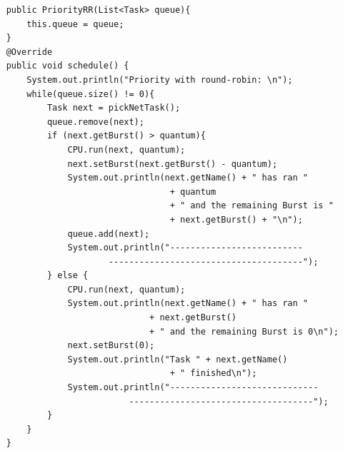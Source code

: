 \documentclass[12pt]{article}
\newenvironment{sol}[1][Solution]{\begin{trivlist}\item[\hskip\labelsep {\bfseries #1:}]}{\end{trivlist}}
\begin{document}
\begin{enumerate}
\begin{sol}
\begin{enumerate}
\begin{verbatim}
    public PriorityRR(List<Task> queue){
        this.queue = queue;
    }
    @Override
    public void schedule() {
        System.out.println("Priority with round-robin: \n");
        while(queue.size() != 0){
            Task next = pickNetTask();
            queue.remove(next);
            if (next.getBurst() > quantum){
                CPU.run(next, quantum);
                next.setBurst(next.getBurst() - quantum);
                System.out.println(next.getName() + " has ran " 
                                    + quantum 
                                    + " and the remaining Burst is " 
                                    + next.getBurst() + "\n");
                queue.add(next);
                System.out.println("--------------------------
                        --------------------------------------");
            } else {
                CPU.run(next, quantum);
                System.out.println(next.getName() + " has ran " 
                                + next.getBurst() 
                                + " and the remaining Burst is 0\n");
                next.setBurst(0);
                System.out.println("Task " + next.getName() 
                                    + " finished\n");
                System.out.println("-----------------------------
                            ------------------------------------");
            }
        }
    }
    

\end{verbatim}
\end{enumerate}
\end{sol}
\end{enumerate}
\end{document}
